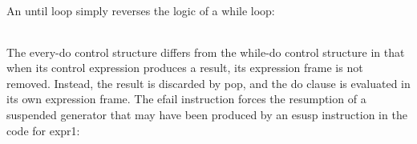 \begin{noIndex}
\begin{center}
\begin{xtabular}{|m{1.9073598in}|m{2.75596in}|}
\end{xtabular}
\end{center}

An until loop simply reverses the logic of a while loop:

\begin{center}
\tablelasttail{\hline}
\begin{xtabular}{|m{1.9073598in}|m{2.75596in}|}

\end{xtabular}
\end{center}

The every-do control structure differs from the while-do control
structure in that when its control expression produces a result, its
expression frame is not removed. Instead, the result is discarded by
pop, and the do clause is evaluated in its own expression frame. The
efail instruction forces the resumption of a suspended generator that
may have been produced by an esusp instruction in the code for expr1:

\begin{center}
\tablelasttail{\hline}
\begin{xtabular}{|m{1.9073598in}|m{2.75596in}|}


\end{xtabular}
\end{center}
\end{noIndex}
